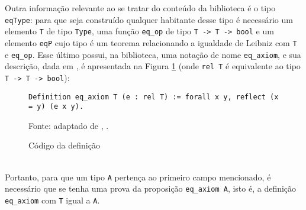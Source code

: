 Outra informação relevante ao se tratar do conteúdo da biblioteca é o tipo \lstinline[language = coq]$eqType$: para que seja construído qualquer habitante desse tipo é necessário um elemento \lstinline[language = coq]$T$ de tipo 
\lstinline[language = coq]$Type$, uma função \lstinline[language = coq]$eq_op$ de tipo \lstinline[language = coq]$T -> T -> bool$
e um elemento \lstinline[language = coq]$eqP$ cujo tipo é um teorema relacionando a igualdade de Leibniz com \lstinline[language = coq]$T$ e \lstinline[language = coq]$eq_op$. Esse último possui, na biblioteca, uma notação de nome \lstinline[language = coq]$eq_axiom$, e sua descrição, dada em \cite{mathcomp-eqtype}, é apresentada na Figura \ref{fig:definition-eqaxiom} (onde \lstinline[language = coq]$rel T$ é equivalente ao tipo \lstinline[language = coq]$T -> T -> bool$):
\begin{figure}[ht]
    \centering
    \caption{Código da definição }
    \begin{lstlisting}[language=coq,frame=single,tabsize=1]
Definition eq_axiom T (e : rel T) := forall x y, reflect (x = y) (e x y).
    \end{lstlisting}
    \footnotesize{Fonte: adaptado de \citeauthor{mathcomp-eqtype}, \citeyear{mathcomp-eqtype}.
    }
    \label{fig:definition-eqaxiom}
\end{figure}
\\

Portanto, para que um tipo \lstinline[language = coq]$A$
pertença ao primeiro campo mencionado, é necessário que se tenha uma prova da proposição \lstinline[language = coq]$eq_axiom A$, isto é, 
a definição \lstinline[language = coq]$eq_axiom$ com 
\lstinline[language = coq]$T$ igual a \lstinline[language = coq]$A$.


